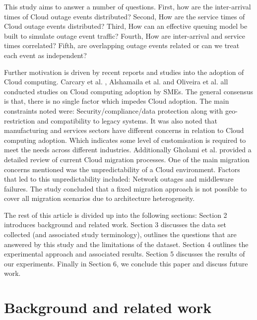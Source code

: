 \documentclass[5p]{elsarticle}
\begin{document}

This study aims to answer a number of questions. First, how are the inter-arrival times of Cloud outage events distributed? Second, How are the service times of Cloud outage events distributed?  Third, How can an effective queuing model be built to simulate outage event traffic? Fourth, How are inter-arrival and service times correlated? Fifth, are overlapping outage events related or can we treat each event as independent? 



Further motivation is driven by recent reports and studies into the adoption of Cloud computing.  Carcary et al. \cite{carcary2014adoption}, Alshamaila et al.  \cite{alshamaila2013cloud} and Oliveira et al. \cite{oliveira2014assessing} all conducted studies on Cloud computing adoption by SMEs. The general consensus is that, there is no single factor which impedes Cloud adoption. The main constraints noted were: Security/compliance/data protection along with geo-restriction and compatibility to legacy systems. It was also noted that manufacturing and services sectors have different concerns in relation to Cloud computing adoption. Which indicates some level of customisation is required to meet the needs across different industries. Additionally Gholami et al. \cite{gholami2016Cloud} provided a detailed review of current Cloud migration processes. One of the main migration concerns mentioned was the unpredictability of a Cloud environment. Factors that led to this unpredictability included: Network outages and middleware failures. The study concluded that a fixed migration approach is not possible to cover all migration scenarios due to architecture heterogeneity.

The rest of this article is divided up into the following sections: Section 2 introduces background and related work. Section 3 discusses the data set collected (and associated study terminology), outlines the questions that are answered by this study and the limitations of the dataset. Section 4 outlines the experimental approach and associated results. Section 5 discusses the results of our experiments. Finally in Section 6, we conclude this paper and discuss future work.

\section{Background and related work}
\end{document}
